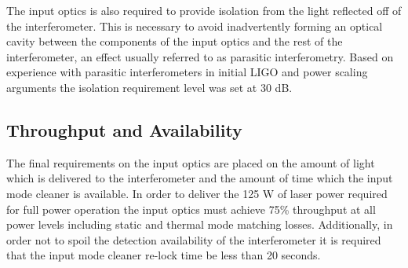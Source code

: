 The input optics is also required to provide isolation from the light reflected off of the 
interferometer.  
This is necessary to avoid inadvertently forming an optical cavity between the components 
of the input optics and the rest of the interferometer, 
an effect usually referred to as parasitic interferometry.  
Based on experience with parasitic interferometers in initial LIGO and power scaling arguments 
the isolation requirement level was set at 30 dB\cite{ligo_T020020}.  


\subsection{Throughput and Availability}
\label{sec:throughput_availability}

The final requirements on the input optics are placed on the amount of light which is delivered 
to the interferometer and the amount of time which the input mode cleaner is available.  
In order to deliver the 125 W of laser power required for full power operation the input optics 
must achieve 75\% throughput at all power levels including static and thermal mode matching losses.  
Additionally, in order not to spoil the detection availability of the interferometer 
it is required that the input mode cleaner re-lock time be less than 20 seconds.  
